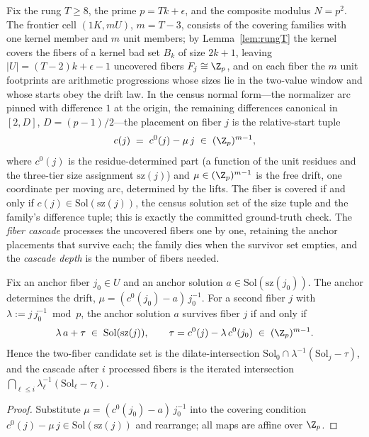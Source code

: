 Fix the rung $T\ge 8$, the prime $p=Tk+\epsilon$, and the composite
modulus $N=p^2$. The frontier cell $(1K,mU)$, $m=T-3$, consists of the
covering families with one kernel member and $m$ unit members; by
Lemma~\ref{lem:rungT} the kernel covers the fibers of a kernel bad set
$B_k$ of size $2k+1$, leaving $|U|=(T-2)k+\epsilon-1$ uncovered fibers
$F_j\cong\Z_p$, and on each fiber the $m$ unit footprints are arithmetic
progressions whose sizes lie in the two-value window and whose starts
obey the drift law. In the census normal form---the normalizer arc
pinned with difference $1$ at the origin, the remaining differences
canonical in $[2,D]$, $D=(p-1)/2$---the placement on fiber $j$ is the
relative-start tuple
\[
c(j)\;=\;c^0(j)-\mu\,j\;\in\;(\Z_p)^{m-1},
\]
where $c^0(j)$ is the residue-determined part (a function of the unit
residues and the three-tier size assignment $\mathrm{sz}(j)$) and
$\mu\in(\Z_p)^{m-1}$ is the free drift, one coordinate per moving arc,
determined by the lifts. The fiber is covered if and only if
$c(j)\in\mathrm{Sol}(\mathrm{sz}(j))$, the census solution set of the
size tuple and the family's difference tuple; this is exactly the
committed ground-truth check. The \emph{fiber cascade} processes the
uncovered fibers one by one, retaining the anchor placements that
survive each; the family dies when the survivor set empties, and the
\emph{cascade depth} is the number of fibers needed.

\begin{lemma}\label{lem:twofiber}
Fix an anchor fiber $j_0\in U$ and an anchor solution
$a\in\mathrm{Sol}(\mathrm{sz}(j_0))$. The anchor determines the drift,
$\mu=(c^0(j_0)-a)\,j_0^{-1}$. For a second fiber $j$ with
$\lambda:=j\,j_0^{-1}\bmod p$, the anchor solution $a$ survives fiber
$j$ if and only if
\[
\lambda\,a+\tau\;\in\;\mathrm{Sol}(\mathrm{sz}(j)),
\qquad
\tau=c^0(j)-\lambda\,c^0(j_0)\;\in\;(\Z_p)^{m-1}.
\]
Hence the two-fiber candidate set is the dilate-intersection
$\mathrm{Sol}_0\cap\lambda^{-1}(\mathrm{Sol}_j-\tau)$, and the cascade
after $i$ processed fibers is the iterated intersection
$\bigcap_{\ell\le i}\lambda_\ell^{-1}(\mathrm{Sol}_\ell-\tau_\ell)$.
\end{lemma}

\begin{proof}
Substitute $\mu=(c^0(j_0)-a)\,j_0^{-1}$ into the covering condition
$c^0(j)-\mu\,j\in\mathrm{Sol}(\mathrm{sz}(j))$ and rearrange; all maps
are affine over $\Z_p$.
\end{proof}

